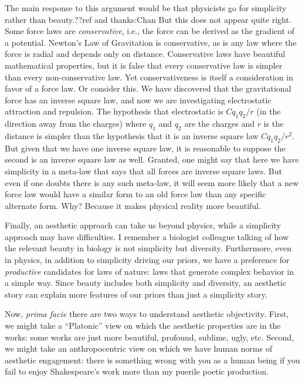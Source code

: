 The main response to this argument would be that physicists go for simplicity rather than beauty.??ref and thanks:Chan 
But this
does not appear quite right. Some force laws are \textit{conservative}, i.e., the force can be derived as 
the gradient of a potential. Newton's Law of Gravitation is conservative, as is any law where the force
is radial and depends only on distance. Conservative laws have beautiful mathematical properties, but it is
false that every conservative law is simpler than every non-conservative law. Yet conservativeness is itself
a consideration in favor of a force law. Or consider this. We have discovered that the gravitational force 
has an inverse square law, and now we are investigating electrostatic attraction and repulsion. The hypothesis
that electrostatic is $Cq_1q_2/r$ (in the direction away from the charges) where $q_1$ and $q_2$ are the charges and
$r$ is the distance is simpler than the hypothesis that it is an inverse square law $Cq_1q_2/r^2$. But given that 
we have one inverse square law, it is reasonable to suppose the second is an inverse square law as well. Granted,
one might say that here we have simplicity in a meta-law that says that all forces are inverse square laws. But 
even if one doubts there is any such meta-law, it will seem more likely that a new force law would have a similar
form to an old force law than any specific alternate form. Why? Because it makes physical reality more beautiful.


Finally, an aesthetic approach can take us beyond physics, while a simplicity approach may have difficulties.
I remember a biologist colleague talking of how the relevant beauty in biology is not simplicity but diversity.
Furthermore, even in physics, in addition to simplicity driving our priors, we have a preference for 
\textit{productive} candidates for laws of nature: laws that generate complex behavior in a simple way.
Since beauty includes both simplicity and diversity, an aesthetic story can explain more features of our
priors than just a simplicity story.

Now, \textit{prima facie} there are two ways to understand aesthetic objectivity. First, we might take a 
``Platonic'' view on which the aesthetic properties are in the works: some works are just more beautiful,
profound, sublime, ugly, etc. Second, we might take an anthropocentric view on which we have human 
norms of aesthetic engagement: there is something wrong with you as a human being if you fail to enjoy 
Shakespeare's work more than my puerile poetic production. 

